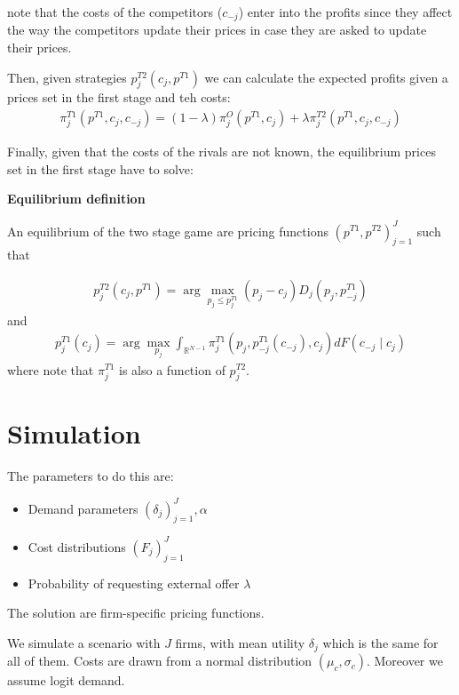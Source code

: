 \documentclass[12pt]{article}
\begin{document}
note that the costs of the competitors ($c_{-j}$) enter into the profits since they affect the way the competitors update their prices in case they are asked to update their prices.

Then, given strategies  $p_j^{T2}(c_j, p^{T1})$ we can calculate the expected profits given a prices set in the first stage and teh costs: 
\begin{align}
    \pi_j^{T1}(p^{T1}, c_j, c_{-j}) = (1-\lambda) \pi_j^O(p^{T1}, c_j) + \lambda \pi_j^{T2}(p^{T1}, c_j, c_{-j})
\end{align}

Finally, given that the costs of the rivals are not known, the equilibrium prices set in the first stage have to solve: 


\textbf{Equilibrium definition}

An equilibrium of the two stage game are pricing functions $(p^{T1}, p^{T2})_{j=1}^J$ such that 


\begin{align}
    p_j^{T2}(c_j, p^{T1}) = \arg \max_{p_j \leq p_j^{T1}} (p_j - c_j) D_j(p_j, p_{-j}^{T1}) 
\end{align}
and 
\begin{align}
    p_j^{T1}(c_j) = \arg \max_{p_j} \int_{\mathbb{R}^{N-1}}^{}  \pi_j^{T1}(p_j, p_{-j}^{T1}(c_{-j}), c_j) dF(c_{-j} \mid c_j)   
\end{align}
where note that $\pi_j^{T1}$ is also a function of $p_j^{T2}$. 




 
\section{Simulation}
The parameters to do this are: 
\begin{itemize}
    \item Demand parameters $(\delta_j)_{j=1}^J, \alpha$
    \item Cost distributions $(F_j)_{j=1}^J$
    \item Probability of requesting external offer $\lambda$
\end{itemize}

The solution are firm-specific pricing functions. 

\medskip

We simulate a scenario with $J$ firms, with mean utility $\delta_j$ which is the same for all of them. Costs are drawn from a normal distribution $(\mu_c, \sigma_c)$. %
Moreover we assume logit demand. 
\end{document}
